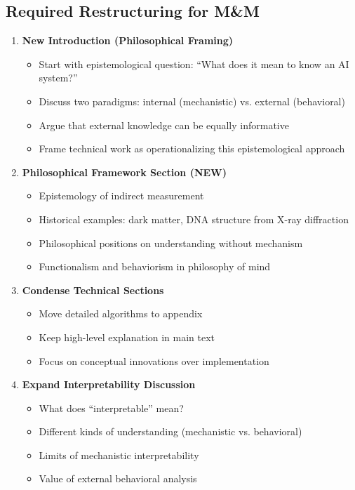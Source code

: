 \documentclass[12pt]{article}
\begin{document}
\subsection{Required Restructuring for M\&M}

\begin{enumerate}[leftmargin=*]
\item \textbf{New Introduction (Philosophical Framing)}
\begin{itemize}
\item Start with epistemological question: ``What does it mean to know an AI system?''
\item Discuss two paradigms: internal (mechanistic) vs. external (behavioral)
\item Argue that external knowledge can be equally informative
\item Frame technical work as operationalizing this epistemological approach
\end{itemize}

\item \textbf{Philosophical Framework Section (NEW)}
\begin{itemize}
\item Epistemology of indirect measurement
\item Historical examples: dark matter, DNA structure from X-ray diffraction
\item Philosophical positions on understanding without mechanism
\item Functionalism and behaviorism in philosophy of mind
\end{itemize}

\item \textbf{Condense Technical Sections}
\begin{itemize}
\item Move detailed algorithms to appendix
\item Keep high-level explanation in main text
\item Focus on conceptual innovations over implementation
\end{itemize}

\item \textbf{Expand Interpretability Discussion}
\begin{itemize}
\item What does ``interpretable'' mean?
\item Different kinds of understanding (mechanistic vs. behavioral)
\item Limits of mechanistic interpretability
\item Value of external behavioral analysis
\end{itemize}


\end{enumerate}
\end{document}

